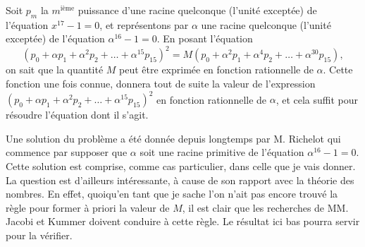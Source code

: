 \documentclass[12pt,a4paper]{article}
\theoremstyle{definition}
\begin{document}
Soit $p_m$ la $m^{\text{i\`{e}me}}$ puissance d'une racine quelconque (l'unit\'{e} except\'{e}e) de l'\'{e}quation $x^{17} - 1 = 0$, et repr\'{e}sentons par $\alpha$ une racine quelconque (l'unit\'{e} except\'{e}e) de l'\'{e}quation $\alpha^{16} - 1 = 0$. En posant l'\'{e}quation
\[
(p_0 + \alpha p_1 + \alpha^2 p_2 + \ldots + \alpha^{15} p_{15})^2 = M(p_0 + \alpha^2 p_1 + \alpha^4 p_2 + \ldots + \alpha^{30} p_{15}),
\]
on sait que la quantit\'{e} $M$ peut \^{e}tre exprim\'{e}e en fonction rationnelle de $\alpha$. Cette fonction une fois connue, donnera tout de suite la valeur de l'expression $(p_0 + \alpha p_1 + \alpha^2 p_2 + \ldots + \alpha^{15} p_{15})^2$ en fonction rationnelle de $\alpha$, et cela suffit pour r\'{e}soudre l'\'{e}quation dont il s'agit.

Une solution du probl\`{e}me a \'{e}t\'{e} donn\'{e}e depuis longtemps par M. Richelot qui commence par supposer que $\alpha$ soit une racine primitive de l'\'{e}quation $\alpha^{16} - 1 = 0$. Cette solution est comprise, comme cas particulier, dans celle que je vais donner. La question est d'ailleurs int\'{e}ressante, \`{a} cause de son rapport avec la th\'{e}orie des nombres. En effet, quoiqu'en tant que je sache l'on n'ait pas encore trouv\'{e} la r\`{e}gle pour former \`{a} priori la valeur de $M$, il est clair que les recherches de MM. Jacobi et Kummer doivent conduire \`{a} cette r\`{e}gle. Le r\'{e}sultat ici bas pourra servir pour la v\'{e}rifier.
\end{document}

